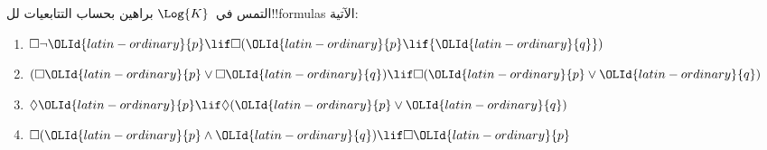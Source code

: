 \documentclass[../../../include/open-logic-section]{subfiles}
\begin{document}

\begin{prob}
  التمس في~$\Log{K}$ براهين بحساب التتابعيات لل!!{formula}s الآتية:
  \begin{enumerate}
    \item $\Box \lnot {\OLId{latin-ordinary}{p}} \lif \Box({\OLId{latin-ordinary}{p}} \lif {\OLId{latin-ordinary}{q}})$
    \item $(\Box {\OLId{latin-ordinary}{p}} \lor \Box {\OLId{latin-ordinary}{q}}) \lif \Box({\OLId{latin-ordinary}{p}} \lor {\OLId{latin-ordinary}{q}})$
    \item $\Diamond {\OLId{latin-ordinary}{p}} \lif \Diamond({\OLId{latin-ordinary}{p}} \lor {\OLId{latin-ordinary}{q}})$
    \item $\Box({\OLId{latin-ordinary}{p}} \land {\OLId{latin-ordinary}{q}}) \lif \Box {\OLId{latin-ordinary}{p}}$
  \end{enumerate}
\end{prob}
\end{document}
